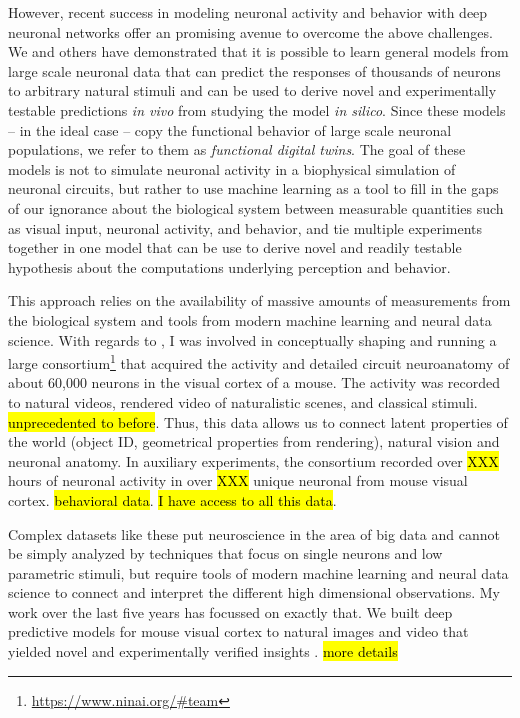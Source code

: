 \documentclass[COG,11pt]{ercgrant}
\begin{document}
However, recent success in modeling neuronal activity and behavior with deep neuronal networks offer an promising avenue to overcome the above challenges. We and others have demonstrated that it is possible to learn general models from large scale neuronal data that can predict the responses of thousands of neurons to arbitrary natural stimuli and can be used to derive novel and experimentally testable predictions \textit{in vivo} from studying the model \textit{in silico}.
Since these models -- in the ideal case -- copy the functional behavior of large scale neuronal populations, we refer to them as \emph{functional digital twins}. The goal of these models is not to simulate neuronal activity in a biophysical simulation of neuronal circuits, but rather to use machine learning as a tool to fill in the gaps of our ignorance about the biological system between measurable quantities such as visual input, neuronal activity, and behavior, and tie  multiple experiments together in one model that can be use to derive novel and readily testable hypothesis about the computations underlying perception and behavior. 

This approach relies on  the availability of massive amounts of measurements from the biological system and  tools from modern machine learning and neural data science. 
With regards to , I was involved in conceptually shaping and running a large consortium\footnote{\url{https://www.ninai.org/\#team}} that acquired the activity and detailed circuit neuroanatomy of about 60,000 neurons in the visual cortex of a mouse. The activity was recorded to natural videos, rendered video of naturalistic scenes, and classical stimuli. \hl{unprecedented to before}. Thus, this data allows us to connect latent properties of the world (object ID, geometrical properties from rendering), natural vision and neuronal anatomy. In auxiliary experiments, the consortium recorded over \hl{XXX} hours of neuronal activity in over \hl{XXX} unique neuronal from mouse visual cortex. \hl{behavioral data}. \hl{I have access to all this data}. 

Complex datasets like these put neuroscience in the area of big data and cannot be simply analyzed by techniques that focus on single neurons and low parametric stimuli, but require tools of modern machine learning and neural data science to connect and interpret the different high dimensional observations. My work over the last five years has focussed on exactly that. We built deep predictive models for mouse visual cortex to natural images and video that yielded novel and experimentally verified insights \parencite{Walker2019-yw, Franke2022-do, Sinz2018-sk}. \hl{more details}
\end{document}
